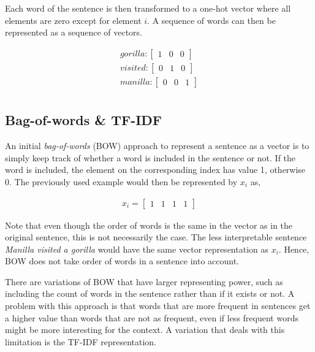 Each word of the sentence is then transformed to a one-hot vector where all elements are zero except for element $i$. A sequence of words can then be represented as a sequence of vectors. 

\begin{align*}
    \textit{gorilla} : \begin{bmatrix}
    1 & 0 & 0 
    \end{bmatrix} \\
    \textit{visited} : \begin{bmatrix}
    0 & 1 & 0 
    \end{bmatrix} \\
    \textit{manilla} : \begin{bmatrix}
    0 & 0 & 1 
    \end{bmatrix} \\
\end{align*}


\subsection{Bag-of-words \& TF-IDF}

An initial \emph{bag-of-words} (BOW) approach to represent a sentence as a vector is to simply keep track of whether a word is included in the sentence or not. If the word is included, the element on the corresponding index has value 1, otherwise 0. The previously used example would then be represented by $x_i$ as, 


\begin{align*}
    x_i = \begin{bmatrix}
    1 & 1 & 1 & 1
    \end{bmatrix}
\end{align*}

Note that even though the order of words is the same in the vector as in the original sentence, this is not necessarily the case. The less interpretable sentence \textit{Manilla visited a gorilla} would have the same vector representation as $x_i$. Hence, BOW does not take order of words in a sentence into account. 

There are variations of BOW that have larger representing power, such as including the count of words in the sentence rather than if it exists or not. A problem with this approach is that words that are more frequent in sentences get a higher value than words that are not as frequent, even if less frequent words might be more interesting for the context. A variation that deals with this limitation is the TF-IDF representation. 

